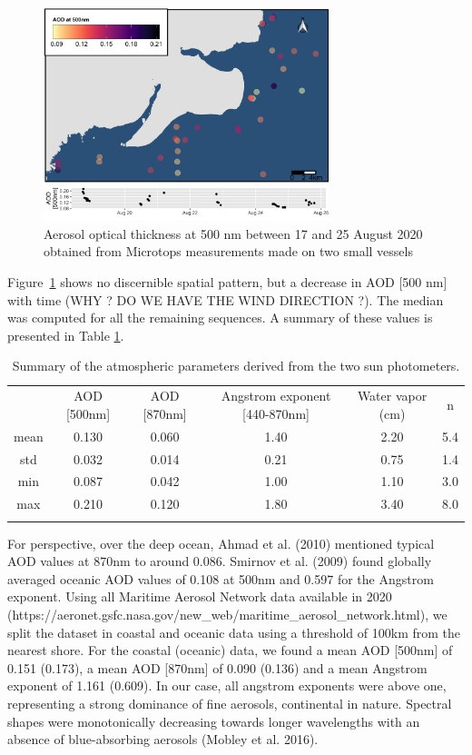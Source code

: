 \documentclass[essd, manuscript]{copernicus}
\begin{document}
\begin{figure}[t]
    \includegraphics[width=8.3cm]{Figures/fig_AOD.png}
    \caption{Aerosol optical thickness at 500 nm between 17 and 25 August 2020 obtained from Microtops measurements made on two small vessels }
    \label{fig:AOD}
\end{figure}

 
Figure~\ref{fig:AOD} shows no discernible spatial pattern, but a decrease in AOD [500 nm] with time (WHY ? DO WE HAVE THE WIND DIRECTION ?). The median was computed for all the remaining sequences. A summary of these values is presented in Table \ref{table:AOT}. 
 

\begin{table}[t]
\caption{Summary of the atmospheric parameters derived from the two sun photometers.}
\centering
\begin{tabular}{ cccccc  }
\tophline
 & AOD [500nm] & AOD [870nm] & Angstrom exponent [440-870nm] & Water vapor (cm) & n\\
\middlehline
mean & 0.130 & 0.060 & 1.40 & 2.20 & 5.4 \\
std & 0.032 & 0.014 & 0.21 & 0.75 & 1.4 \\
min & 0.087 & 0.042 & 1.00 & 1.10 & 3.0 \\
max & 0.210 & 0.120 & 1.80 & 3.40 & 8.0 \\
\bottomhline
 \end{tabular}
 \label{table:AOT}
\end{table}

 
For perspective, over the deep ocean, Ahmad et al. (2010) mentioned typical AOD values at 870nm to around 0.086. Smirnov et al. (2009) found globally averaged oceanic AOD values of 0.108 at 500nm and 0.597 for the Angstrom exponent. Using all Maritime Aerosol Network data available in 2020 (https://aeronet.gsfc.nasa.gov/new\_web/maritime\_aerosol\_network.html), we split the dataset in coastal and oceanic data using a threshold of 100km from the nearest shore. For the coastal (oceanic) data, we found a mean AOD [500nm] of 0.151 (0.173), a mean AOD [870nm] of 0.090 (0.136) and a mean Angstrom exponent of 1.161 (0.609). In our case, all angstrom exponents were above one, representing a strong dominance of fine aerosols, continental in nature. Spectral shapes were monotonically decreasing towards longer wavelengths with an absence of blue-absorbing aerosols (Mobley et al. 2016).
\end{document}
